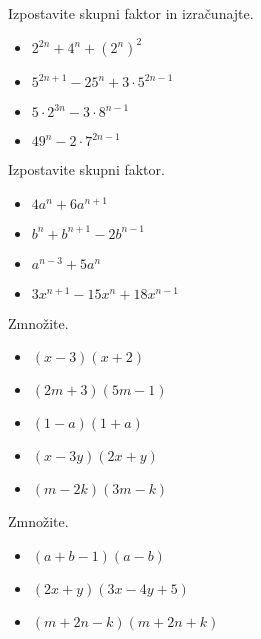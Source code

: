 \begin{multicols}{2}
    
        
            \begin{naloga}
                Izpostavite skupni faktor in izračunajte.
                \begin{itemize}
                    \item $2^{2n}+4^n+(2^n)^2$ 
                    \item $5^{2n+1}-25^n+3\cdot 5^{2n-1}$ 
                    \item $5\cdot 2^{3n}-3\cdot 8^{n-1}$ 
                    \item $49^n-2\cdot 7^{2n-1}$ 
                \end{itemize}
            \end{naloga}
        
    
        
            \begin{naloga}
                Izpostavite skupni faktor.
                \begin{itemize}
                    \item $4a^n+6a^{n+1}$ 
                    \item $b^n+b^{n+1}-2b^{n-1}$ 
                    \item $a^{n-3}+5a^n$ 
                    \item $3x^{n+1}-15x^n+18x^{n-1}$ 
                \end{itemize}
            \end{naloga}
        
    
        
            \begin{naloga}
                Zmnožite.
                \begin{itemize}
                    \item $(x-3)(x+2)$ 
                    \item $(2m+3)(5m-1)$ 
                    \item $(1-a)(1+a)$ 
                    \item $(x-3y)(2x+y)$ 
                    \item $(m-2k)(3m-k)$ 
                \end{itemize}
            \end{naloga}
        
    
        
            \begin{naloga}
                Zmnožite.
                \begin{itemize}
                    \item $(a+b-1)(a-b)$ 
                    \item $(2x+y)(3x-4y+5)$ 
                    \item $(m+2n-k)(m+2n+k)$ 
                \end{itemize}
            \end{naloga}
        

\end{multicols}
